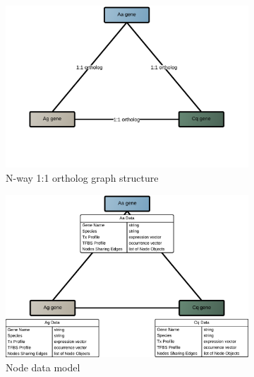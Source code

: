 
\begin{figure}[]
\centering
% 
    \begin{subfigure}[t]{.5\linewidth}
    \centering
    \includegraphics[width=\linewidth]{figures/figs/gfunc_graph_figs/ortho-graph-model.pdf}
    \caption{N-way 1:1 ortholog graph structure}\label{fig:nway-ortholog-graph-model}
    \end{subfigure}%
% 
% 
% 
    \begin{subfigure}[t]{.5\linewidth}
    \centering
    \includegraphics[width=\linewidth]{figures/figs/gfunc_graph_figs/ortho-graph-node-data.pdf}
    \caption{Node data model}\label{fig:nway-ortholog-graph-node-data}
    \end{subfigure}
% 
% 
% 
% 
% 
% 
    \begin{subfigure}[t]{.5\linewidth}
    \centering

\end{subfigure}
\end{figure}
